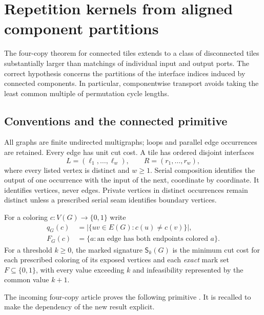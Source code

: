 
\section{Repetition kernels from aligned component partitions}
\label{sec:aligned-routing}

The four-copy theorem for connected tiles extends to a class of disconnected
tiles substantially larger than matchings of individual input and output ports.
The correct hypothesis concerns the partitions of the interface indices induced
by connected components.  In particular, componentwise transport avoids taking
the least common multiple of permutation cycle lengths.

\subsection{Conventions and the connected primitive}

All graphs are finite undirected multigraphs; loops and parallel edge occurrences
are retained.  Every edge has unit cut cost.  A tile has ordered disjoint
interfaces
\[
 L=(\ell_1,\ldots,\ell_w),\qquad R=(r_1,\ldots,r_w),
\]
where every listed vertex is distinct and $w\geq1$.  Serial composition identifies
the output of one occurrence with the input of the next, coordinate by coordinate.
It identifies vertices, never edges.  Private vertices in distinct occurrences
remain distinct unless a prescribed serial seam identifies boundary vertices.

For a coloring $c:V(G)\to\{0,1\}$ write
\[
 \begin{aligned}
 q_G(c)&=|\{uv\in E(G):c(u)\ne c(v)\}|,\\
 F_G(c)&=\{a:\text{an edge has both endpoints colored }a\}.
 \end{aligned}
\]
For a threshold $k\geq0$, the marked signature $\mathsf S_k(G)$ is the minimum
cut cost for each prescribed coloring of its exposed vertices and each
\emph{exact} mark set $F\subseteq\{0,1\}$, with every value exceeding $k$ and
infeasibility represented by the common value $k+1$.

The incoming four-copy article proves the following primitive
\cite{incoming-four-copy}.  It is recalled to make the dependency of the new
result explicit.

